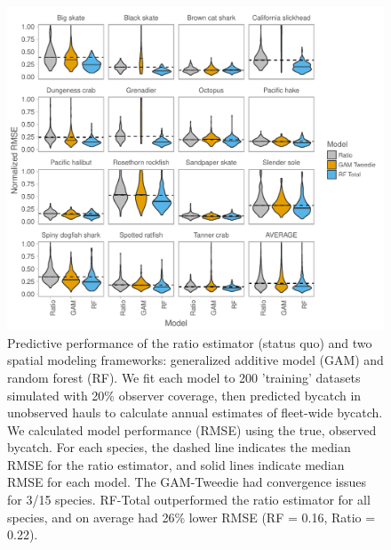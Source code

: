 \documentclass[]{article}
\begin{document}
\begin{figure}

{\centering \includegraphics{bycatch_sim_paper_files/figure-latex/model-comparison-1} 

}

\caption{Predictive performance of the ratio estimator (status quo) and two spatial modeling frameworks: generalized additive model (GAM) and random forest (RF). We fit each model to 200 'training' datasets simulated with 20\% observer coverage, then predicted bycatch in unobserved hauls to calculate annual estimates of fleet-wide bycatch. We calculated model performance (RMSE) using the true, observed bycatch. For each species, the dashed line indicates the median RMSE for the ratio estimator, and solid lines indicate median RMSE for each model. The GAM-Tweedie had convergence issues for 3/15 species. RF-Total outperformed the ratio estimator for all species, and on average had 26\% lower RMSE (RF = 0.16, Ratio = 0.22).}\label{fig:model-comparison}
\end{figure}

\pagebreak
\end{document}
